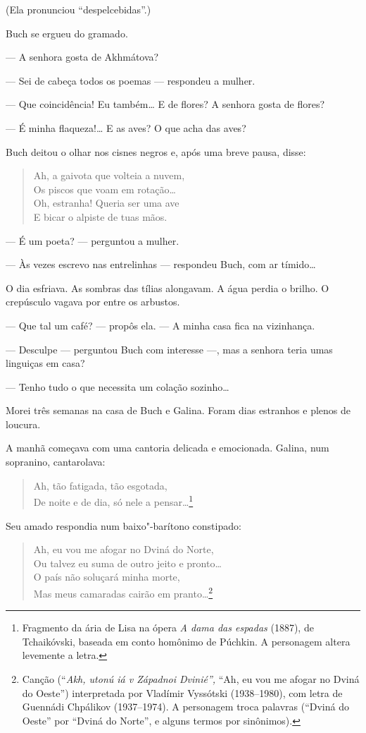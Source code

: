 (Ela pronunciou ``despelcebidas''.)

Buch se ergueu do gramado.

--- A senhora gosta de Akhmátova?

--- Sei de cabeça todos os poemas --- respondeu a mulher.

--- Que coincidência! Eu também\ldots{} E de flores? A senhora gosta de
flores?

--- É minha flaqueza!\ldots{} E as aves? O que acha das aves?

Buch deitou o olhar nos cisnes negros e, após uma breve pausa, disse:

\begin{verse}
Ah, a gaivota que volteia a nuvem,\\
Os piscos que voam em rotação\ldots{}\\
Oh, estranha! Queria ser uma ave\\
E bicar o alpiste de tuas mãos.
\end{verse}

--- É um poeta? --- perguntou a mulher.

--- Às vezes escrevo nas entrelinhas --- respondeu Buch, com ar
tímido\ldots{}

O dia esfriava. As sombras das tílias alongavam. A água perdia o brilho. O crepúsculo vagava por entre os arbustos.

--- Que tal um café? --- propôs ela. --- A minha casa fica na
vizinhança.

--- Desculpe --- perguntou Buch com interesse ---, mas a senhora teria
umas linguiças em casa?

--- Tenho tudo o que necessita um colação sozinho\ldots{}

Morei três semanas na casa de Buch e Galina. Foram dias estranhos e
plenos de loucura.

A manhã começava com uma cantoria delicada e emocionada. Galina, num
sopranino, cantarolava:

\begin{verse}
Ah, tão fatigada, tão esgotada,\\
De noite e de dia, só nele a pensar\ldots{}\footnote{Fragmento da ária de
  Lisa na ópera \emph{A dama das espadas} (1887), de Tchaikóvski,
  baseada em conto homônimo de Púchkin. A personagem altera levemente a
  letra.}
\end{verse}

Seu amado respondia num baixo"-barítono constipado:

\begin{verse}
Ah, eu vou me afogar no Dviná do Norte,\\
Ou talvez eu suma de outro jeito e pronto\ldots{}\\
O país não soluçará minha morte,\\
Mas meus camaradas cairão em pranto\ldots{}\footnote{Canção (``\emph{Akh,
  utonú iá v Západnoi Dvinié'',} ``Ah, eu vou me afogar no Dviná do
  Oeste'') interpretada por Vladímir Vyssótski (1938--1980), com letra
  de Guennádi Chpálikov (1937--1974). A personagem troca palavras
  (``Dviná do Oeste'' por ``Dviná do Norte'', e alguns termos por
  sinônimos).}
\end{verse}

